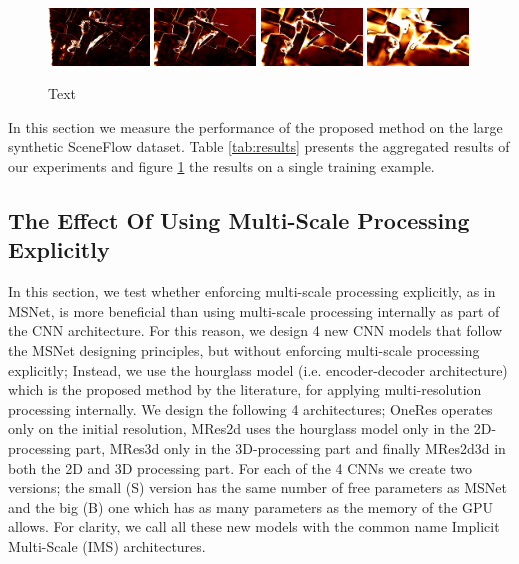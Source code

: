 \documentclass[runningheads]{llncs}
\begin{document}
\begin{figure}[!htbp]
\begin{center}
        \includegraphics[width=0.24\textwidth,clip]{figures/pred_0_err.png}
        \includegraphics[width=0.24\textwidth,clip]{figures/pred_1_err.png}
        \includegraphics[width=0.24\textwidth,clip]{figures/pred_2_err.png}
        \includegraphics[width=0.24\textwidth,clip]{figures/pred_3_err.png}\\        
    \end{center}
    
    \caption{Text}
    \label{fig:EMAPs}
\end{figure}

In this section we measure the performance of the proposed method on the large synthetic SceneFlow dataset. Table \ref{tab:results} presents the aggregated results of our experiments and figure \ref{fig:EMAPs} the results on a single training example.

\subsection{The Effect Of Using Multi-Scale Processing Explicitly}

In this section, we test whether enforcing multi-scale processing explicitly, as in MSNet, is more beneficial than using multi-scale processing internally as part of the CNN architecture. For this reason, we design 4 new CNN models that follow the MSNet designing principles, but without enforcing multi-scale processing explicitly; Instead, we use the hourglass model (i.e. encoder-decoder architecture) which is the proposed method by the literature, for applying multi-resolution processing internally. We design the following 4 architectures; OneRes operates only on the initial resolution, MRes2d uses the hourglass model only in the 2D-processing part, MRes3d only in the 3D-processing part and finally MRes2d3d in both the 2D and 3D processing part. For each of the 4 CNNs we create two versions; the small (S) version has the same number of free parameters as MSNet and the big (B) one which has as many parameters as the memory of the GPU allows. For clarity, we call all these new models with the common name Implicit Multi-Scale (IMS) architectures.
\end{document}
